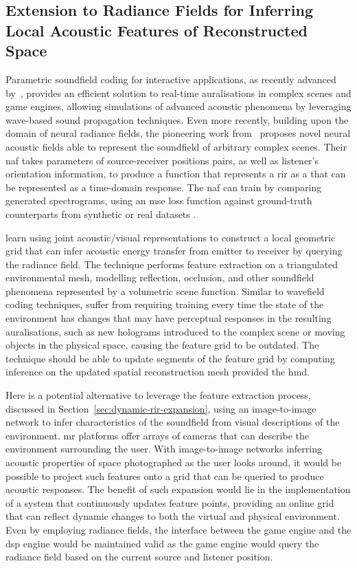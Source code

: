 \subsection{Extension to Radiance Fields for Inferring Local Acoustic Features of Reconstructed Space}
Parametric soundfield coding for interactive applications, as recently advanced by~\cite{raghuvanshi2018parametric}, provides an efficient solution to real-time auralisations in complex scenes and game engines, allowing simulations of advanced acoustic phenomena by leveraging wave-based sound propagation techniques. Even more recently, building upon the domain of neural radiance fields, the pioneering work from~\cite{luo2022learning} proposes novel neural acoustic fields able to represent the soundfield of arbitrary complex scenes. Their \acrshort{naf} takes parameters of source-receiver positions pairs, as well as listener's orientation information, to produce a function that represents a \acrshort{rir} as a  that can be represented as a time-domain response. The \acrshort{naf} can train by comparing generated spectrograms, using an \acrshort{mse} loss function against ground-truth counterparts from synthetic or real datasets \citep{chen2022soundspaces}.\par
{} learn using joint acoustic/visual representations to construct a local geometric grid that can infer acoustic energy transfer from emitter to receiver by querying the radiance field. The technique performs feature extraction on a triangulated environmental mesh, modelling reflection, occlusion, and other soundfield phenomena represented by a volumetric scene function. Similar to wavefield coding techniques,  suffer from requiring training every time the state of the environment has changes that may have perceptual responses in the resulting auralisations, such as new holograms introduced to the complex scene or moving objects in the physical space, causing the feature grid to be outdated. The technique should be able to update segments of the feature grid by computing inference on the updated spatial reconstruction mesh provided the \acrshort{hmd}.\par
Here is a potential alternative to leverage the feature extraction process, discussed in Section~\ref{sec:dynamic-rir-expansion}, using an image-to-image network to infer characteristics of the soundfield from visual descriptions of the environment. \acrshort{mr} platforms offer arrays of cameras that can describe the environment surrounding the user. With image-to-image networks inferring acoustic properties of space photographed as the user looks around, it would be possible to project such features onto a grid that can be queried to produce acoustic responses. The benefit of such expansion would lie in the implementation of a system that continuously updates feature points, providing an online grid that can reflect dynamic changes to both the virtual and physical environment. Even by employing radiance fields, the interface between the game engine and the \acrshort{dsp} engine would be maintained valid as the game engine would query the radiance field based on the current source and listener position.

